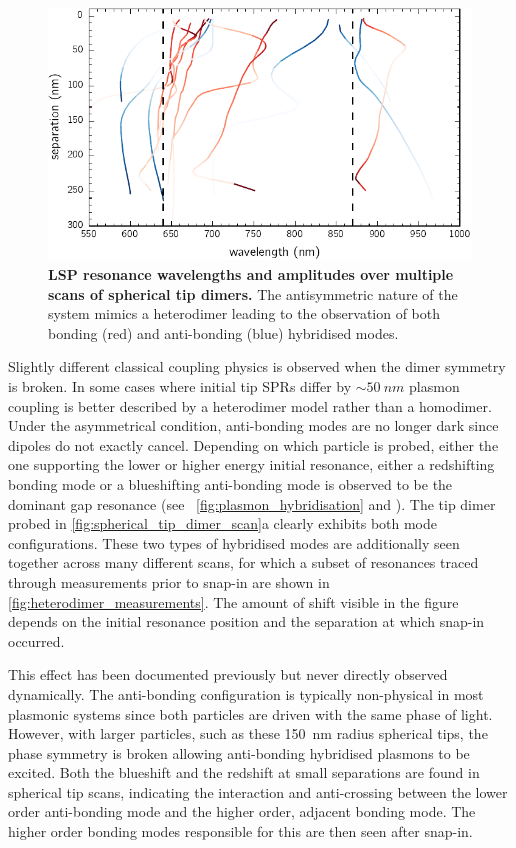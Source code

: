 \documentclass[a4paper]{article}
\begin{document}
\begin{figure}[bt]
\centering
\includegraphics{figures/classical_mode_fits}
\caption[LSP resonance wavelengths and amplitudes over multiple scans of spherical tip dimers]{\textbf{LSP resonance wavelengths and amplitudes over multiple scans of spherical tip dimers.} The antisymmetric nature of the system mimics a heterodimer leading to the observation of both bonding (red) and anti-bonding (blue) hybridised modes.}
\label{fig:heterodimer_measurements}
\end{figure}

Slightly different classical coupling physics is observed when the dimer symmetry is broken. In some cases where initial tip SPRs differ by $\sim\SI{50}{nm}$ plasmon coupling is better described by a heterodimer model rather than a homodimer. Under the asymmetrical condition, anti-bonding modes are no longer dark since dipoles do not exactly cancel. Depending on which particle is probed, either the one supporting the lower or higher energy initial resonance, either a redshifting bonding mode or a blueshifting anti-bonding mode is observed to be the dominant gap resonance (see \figurename~\ref{fig:plasmon_hybridisation} and \cite{nordlander2004}). The tip dimer probed in \autoref{fig:spherical_tip_dimer_scan}a clearly exhibits both mode configurations. These two types of hybridised modes are additionally seen together across many different scans, for which a subset of resonances traced through measurements prior to snap-in are shown in \autoref{fig:heterodimer_measurements}. The amount of shift visible in the figure depends on the initial resonance position and the separation at which snap-in occurred.

This effect has been documented previously \cite{nordlander2004} but never directly observed dynamically. The anti-bonding configuration is typically non-physical in most plasmonic systems since both particles are driven with the same phase of light. However, with larger particles, such as these \SI{150}{nm} radius spherical tips, the phase symmetry is broken allowing anti-bonding hybridised plasmons to be excited. Both the blueshift and the redshift at small separations are found in spherical tip scans, indicating the interaction and anti-crossing between the lower order anti-bonding mode and the higher order, adjacent bonding mode. The higher order bonding modes responsible for this are then seen after snap-in.
\end{document}
